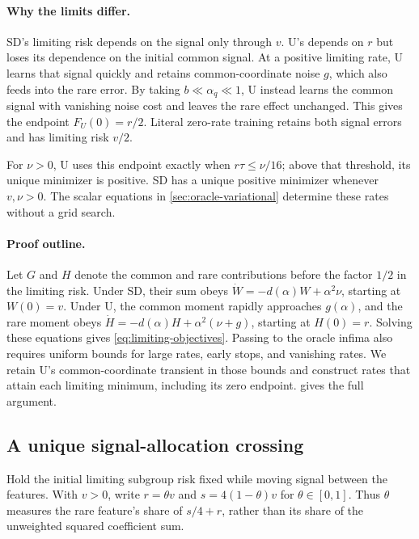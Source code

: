 \paragraph{Why the limits differ.}

SD's limiting risk depends on the signal only through $v$. U's depends on $r$
but loses its dependence on the initial common signal. At a positive limiting
rate, U learns that signal quickly and retains common-coordinate noise $g$,
which also feeds into the rare error. By taking $b\ll\alpha_q\ll1$, U instead
learns the common signal with vanishing noise cost and leaves the rare effect
unchanged. This gives the endpoint $F_U(0)=r/2$. Literal zero-rate training
retains both signal errors and has limiting risk $v/2$.

For $\nu>0$, U uses this endpoint exactly when $r\tau\leq\nu/16$; above that
threshold, its unique minimizer is positive. SD has a unique positive minimizer
whenever $v,\nu>0$. The scalar equations in \cref{sec:oracle-variational}
determine these rates without a grid search.

\paragraph{Proof outline.}

Let $G$ and $H$ denote the common and rare contributions before the factor
$1/2$ in the limiting risk. Under SD, their sum obeys
$\dot W=-d(\alpha)W+\alpha^2\nu$, starting at $W(0)=v$. Under U, the common
moment rapidly approaches $g(\alpha)$, and the rare moment obeys
$\dot H=-d(\alpha)H+\alpha^2(\nu+g)$, starting at $H(0)=r$. Solving these
equations gives \cref{eq:limiting-objectives}. Passing to the oracle infima
also requires uniform bounds for large rates, early stops, and vanishing rates.
We retain U's common-coordinate transient in those bounds and construct rates
that attain each limiting minimum, including its zero endpoint.
 gives the full argument.

\subsection{A unique signal-allocation crossing}
\label{sec:oracle-allocation}

Hold the initial limiting subgroup risk fixed while moving signal between the
features. With $v>0$, write $r=\theta v$ and $s=4(1-\theta)v$ for
$\theta\in[0,1]$. Thus $\theta$ measures the rare feature's share of $s/4+r$,
rather than its share of the unweighted squared coefficient sum.

